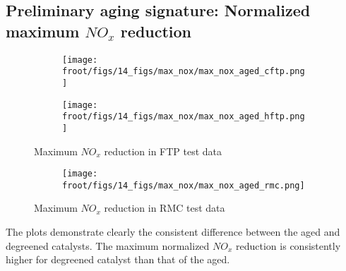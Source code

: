 \subsection{Preliminary aging signature: Normalized maximum $NO_x$ reduction}

\begin{figure}[H]
        \begin{minipage}{0.49\textwidth}
                \begin{figure}[H]
                        \centering
                        \texttt{[image: \\froot/figs/14\_figs/max\_nox/max\_nox\_aged\_cftp.png]}
                \end{figure}
        \end{minipage}
        \begin{minipage}{0.49\textwidth}
                \begin{figure}[H]
                        \centering
                        \texttt{[image: \\froot/figs/14\_figs/max\_nox/max\_nox\_aged\_hftp.png]}
                \end{figure}
        \end{minipage}
        \caption{Maximum $NO_x$ reduction in FTP test data}
\end{figure}

\begin{figure}[H]
        \centering
        \begin{minipage}{0.49\textwidth}
                \begin{figure}[H]
                        \centering
                        \texttt{[image: \\froot/figs/14\_figs/max\_nox/max\_nox\_aged\_rmc.png]}
                \end{figure}
        \end{minipage}
        \caption{Maximum $NO_x$ reduction in RMC test data}
\end{figure}

The plots demonstrate clearly the consistent difference between the aged and degreened catalysts. The maximum normalized $NO_x$ reduction is consistently higher for degreened catalyst than that of the aged.
